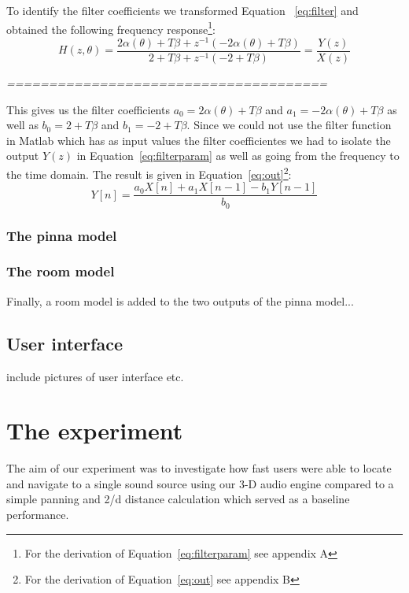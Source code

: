 \documentclass[journal]{IEEEtran}
\begin{document}
To identify the filter coefficients we transformed Equation ~\ref{eq:filter} and obtained the following frequency response\footnote{For the derivation of Equation~\ref{eq:filterparam} see appendix A}:
\begin{equation}\label{eq:filterparam}
H\left( z,\theta\right) = \frac{2\alpha (\theta)+T\beta+z^{-1}(-2\alpha(\theta)+T\beta)}{2+T\beta+z^{-1}(-2+T\beta)} = \frac{Y(z)}{X(z)}
\end{equation} 

\emph{======================================}

This gives us the filter coefficients $a_0 = 2\alpha (\theta)+T\beta$ and $a_1 = -2\alpha(\theta)+T\beta$ as well as $b_0 = 2+T\beta$ and $b_1 = -2+T\beta$. Since we could not use the filter function in Matlab which has as input values the filter coefficientes we had to isolate the output $Y(z)$ in Equation~\ref{eq:filterparam} as well as going from the frequency to the time domain. The result is given in Equation~\ref{eq:out}\footnote{For the derivation of Equation~\ref{eq:out} see appendix B}:
\begin{equation}\label{eq:out}
Y[n] =\frac{a_0X[n]+a_1X[n-1]-b_1Y[n-1]}{b_0}
\end{equation} 

\subsubsection{The pinna model}



\subsubsection{The room model}

Finally, a room model is added to the two outputs of the pinna model...





\subsection{User interface}
include pictures of user interface etc.

\section{The experiment}
The aim of our experiment was to investigate how fast users were able to locate and navigate to a single sound source using our 3-D audio engine compared to a simple panning and 2/d distance calculation which served as a baseline performance. 
\end{document}
